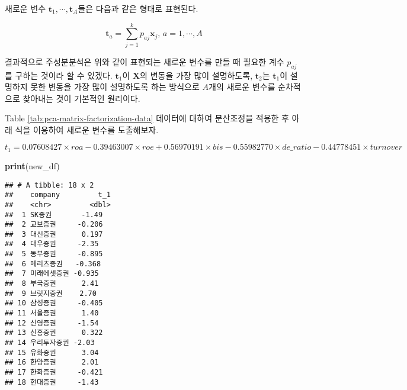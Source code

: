 \documentclass[]{book}
\newenvironment{Shaded}{\begin{snugshade}}{\end{snugshade}}
\newcommand{\CommentTok}[1]{\textcolor[rgb]{0.56,0.35,0.01}{\textit{#1}}}
\newcommand{\DataTypeTok}[1]{\textcolor[rgb]{0.13,0.29,0.53}{#1}}
\newcommand{\DecValTok}[1]{\textcolor[rgb]{0.00,0.00,0.81}{#1}}
\newcommand{\FloatTok}[1]{\textcolor[rgb]{0.00,0.00,0.81}{#1}}
\newcommand{\KeywordTok}[1]{\textcolor[rgb]{0.13,0.29,0.53}{\textbf{#1}}}
\newcommand{\NormalTok}[1]{#1}
\newcommand{\OperatorTok}[1]{\textcolor[rgb]{0.81,0.36,0.00}{\textbf{#1}}}
\newcommand{\StringTok}[1]{\textcolor[rgb]{0.31,0.60,0.02}{#1}}
\begin{document}
새로운 변수 \(\mathbf{t}_1, \cdots, \mathbf{t}_A\)들은 다음과 같은 형태로 표현된다.

\begin{equation}
\mathbf{t}_a = \sum_{j = 1}^{k} p_{aj} \mathbf{x}_j, \, a = 1, \cdots, A
\end{equation}

결과적으로 주성분분석은 위와 같이 표현되는 새로운 변수를 만들 때 필요한 계수 \(p_{aj}\)를 구하는 것이라 할 수 있겠다. \(\mathbf{t}_1\)이 \(\mathbf{X}\)의 변동을 가장 많이 설명하도록, \(\mathbf{t}_2\)는 \(\mathbf{t}_1\)이 설명하지 못한 변동을 가장 많이 설명하도록 하는 방식으로 \(A\)개의 새로운 변수를 순차적으로 찾아내는 것이 기본적인 원리이다.

Table \ref{tab:pca-matrix-factorization-data} 데이터에 대하여 분산조정을 적용한 후 아래 식을 이용하여 새로운 변수를 도출해보자.

\[
t_1 = 0.07608427 \times roa - 0.39463007 \times roe + 0.56970191 \times bis - 0.55982770 \times de\_ratio - 0.44778451 \times turnover
\]

\begin{Shaded}
\end{Shaded}

\begin{Shaded}
\begin{Highlighting}[]
\KeywordTok{print}\NormalTok{(new_df)}
\end{Highlighting}
\end{Shaded}

\begin{verbatim}
## # A tibble: 18 x 2
##    company         t_1
##    <chr>         <dbl>
##  1 SK증권       -1.49 
##  2 교보증권     -0.206
##  3 대신증권      0.197
##  4 대우증권     -2.35 
##  5 동부증권     -0.895
##  6 메리츠증권   -0.368
##  7 미래에셋증권 -0.935
##  8 부국증권      2.41 
##  9 브릿지증권    2.70 
## 10 삼성증권     -0.405
## 11 서울증권      1.40 
## 12 신영증권     -1.54 
## 13 신흥증권      0.322
## 14 우리투자증권 -2.03 
## 15 유화증권      3.04 
## 16 한양증권      2.01 
## 17 한화증권     -0.421
## 18 현대증권     -1.43
\end{verbatim}
\end{document}
